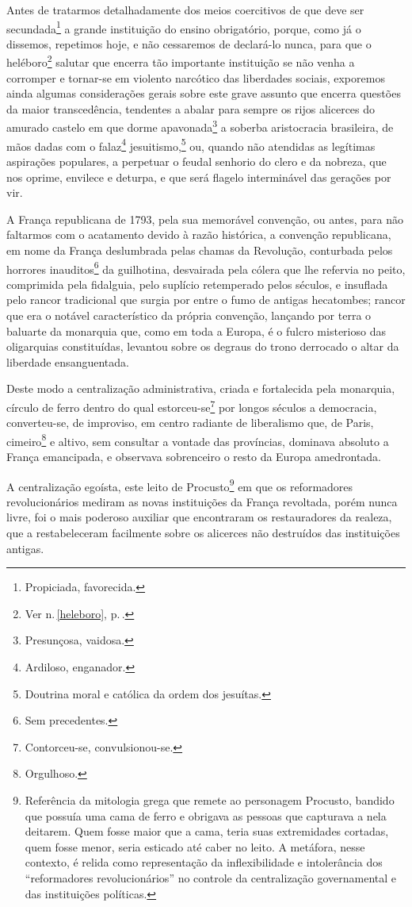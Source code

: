 Antes de tratarmos detalhadamente dos meios coercitivos de que deve ser
secundada\footnote{Propiciada, favorecida.} a grande instituição do
ensino obrigatório, porque, como já o dissemos, repetimos hoje, e não
cessaremos de declará-lo nunca, para que o heléboro\footnote{Ver n.\,\ref{heleboro}, p.\,\pageref{heleboro}.} salutar
que encerra tão importante instituição se não venha a corromper e
tornar-se em violento narcótico das liberdades sociais, exporemos ainda
algumas considerações gerais sobre este grave assunto que encerra
questões da maior transcedência, tendentes a abalar para sempre os rijos
alicerces do amurado castelo em que dorme apavonada\footnote{
  Presunçosa, vaidosa.} a soberba aristocracia brasileira, de mãos dadas
com o falaz\footnote{Ardiloso, enganador.} jesuitismo,\footnote{
  Doutrina moral e católica da ordem dos jesuítas.} ou,
quando não atendidas as legítimas aspirações populares, a perpetuar o
feudal senhorio do clero e da nobreza, que nos oprime, envilece e
deturpa, e que será flagelo interminável das gerações por vir.

A França republicana de 1793, pela sua memorável convenção, ou antes,
para não faltarmos com o acatamento devido à razão histórica, a
convenção republicana, em nome da França deslumbrada pelas chamas da
Revolução, conturbada pelos horrores inauditos\footnote{Sem
  precedentes.} da guilhotina, desvairada pela cólera que lhe refervia
no peito, comprimida pela fidalguia, pelo suplício retemperado pelos
séculos, e insuflada pelo rancor tradicional que surgia por entre o fumo
de antigas hecatombes; rancor que era o notável característico da
própria convenção, lançando por terra o baluarte da monarquia que, como
em toda a Europa, é o fulcro misterioso das oligarquias constituídas,
levantou sobre os degraus do trono derrocado o altar da liberdade
ensanguentada.

Deste modo a centralização administrativa, criada e fortalecida pela
monarquia, círculo de ferro dentro do qual estorceu-se\footnote{
  Contorceu-se, convulsionou-se.} por longos séculos a democracia,
converteu-se, de improviso, em centro radiante de liberalismo que, de
Paris, cimeiro\footnote{Orgulhoso.} e altivo, sem consultar a vontade
das províncias, dominava absoluto a França emancipada, e observava
sobrenceiro o resto da Europa amedrontada.

A centralização egoísta, este leito de Procusto\footnote{Referência da\label{procusto}
  mitologia grega que remete ao personagem Procusto, bandido que possuía
  uma cama de ferro e obrigava as pessoas que capturava a nela deitarem.
  Quem fosse maior que a cama, teria suas extremidades cortadas, quem
  fosse menor, seria esticado até caber no leito. A metáfora, nesse
  contexto, é relida como representação da inflexibilidade e
  intolerância dos ``reformadores revolucionários'' no controle da
  centralização governamental e das instituições políticas.} em que os
reformadores revolucionários mediram as novas instituições da França
revoltada, porém nunca livre, foi o mais poderoso auxiliar que
encontraram os restauradores da realeza, que a restabeleceram facilmente
sobre os alicerces não destruídos das instituições antigas.

